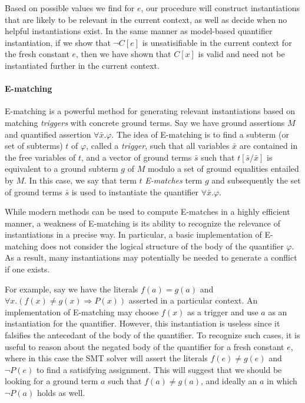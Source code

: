 \documentclass{llncs}
\begin{document}
Based on possible values we find for $e$, our procedure will construct instantiations that are likely to be relevant in the current context, as well as decide when no helpful instantiations exist.
In the same manner as model-based quantifier instantiation, if we show that $\neg C[e]$ is unsatisifiable in the current context for the fresh constant $e$, then we have shown that $C[x]$ is valid and need not be instantiated further in the current context.

\paragraph{E-matching}
E-matching is a powerful method for generating relevant instantiations based on matching \emph{triggers} with concrete ground terms. 
Say we have ground assertions $M$ and quantified assertion $\forall \bar{x}. \varphi$.
The idea of E-matching is to find a subterm (or set of subterms) $t$ of $\varphi$, called a \emph{trigger}, such that all variables $\bar{x}$ are contained in the free variables of $t$, and a vector of ground terms $\bar{s}$ such that $t[\bar{s}/\bar{x}]$ is equivalent to a ground subterm $g$ of $M$ modulo a set of ground equalities entailed by $M$.
In this case, we say that term $t$ \emph{E-matches} term $g$ and subsequently the set of ground terms $\bar{s}$ is used to instantiate the quantifier $\forall \bar{x}. \varphi$.

While modern methods can be used to compute E-matches in a highly efficient manner, a weakness of E-matching is its ability to recognize the relevance of instantiations in a precise way.
In particular, a basic implementation of E-matching does not consider the logical structure of the body of the quantifier $\varphi$.
As a result, many instantiations may potentially be needed to generate a conflict if one exists.

For example, say we have the literals $f( a ) = g( a )$ and $\forall x. ( f(x) \neq g(x) \Rightarrow P( x ) )$ asserted in a particular context. 
An implementation of E-matching may choose $f( x )$ as a trigger and use $a$ as an instantiation for the quantifier.
However, this instantiation is useless since it falsifies the antecedant of the body of the quantifier.
To recognize such cases, it is useful to reason about the negated body of the quantifier for a fresh constant $e$, where in this case the SMT solver will assert the literals $f( e ) \neq g( e )$ and $\neg P( e )$ to find a satisifying assignment.
This will suggest that we should be looking for a ground term $a$ such that $f( a ) \neq g( a )$, and ideally an $a$ in which $\neg P( a )$ holds as well.
\end{document}
